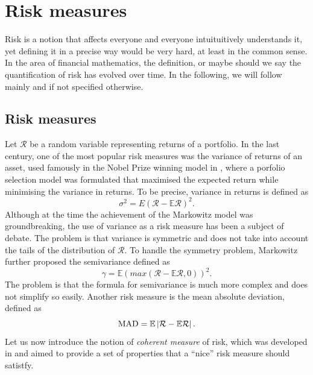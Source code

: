 \chapter{Risk measures}
Risk is a notion that affects everyone and everyone intuituitively understands it, yet defining it in a precise way would be very hard, at least in the common sense. In the area of financial mathematics, the definition, or maybe should we say the quantification of risk has evolved over time. In the following, we will follow mainly \cite{leoppold_risk_measures} and \cite[p. 275-278]{cornuejols_tutuncu_2006} if not specified otherwise.

\section{Risk measures	}
Let $\mathcal{R}$ be a random variable representing returns of a portfolio. In the last century, one of the most popular risk measures was the variance of returns of an asset, used famously in the Nobel Prize winning model in \cite{markowitz}, where a porfolio selection model was formulated that maximised the expected return while minimising the variance in returns. To be precise, variance in returns is defined as
\begin{equation*}
\sigma^2=E(\mathcal{R} - \mathbb{E}\mathcal{R} )^2.
\end{equation*}
Although at the time the achievement of the Markowitz model was groundbreaking, the use of variance as a risk measure has been a subject of debate. The problem is that variance is symmetric and does not take into account the tails of the distribution of $\mathcal{R}$. To handle the symmetry problem, Markowitz further proposed the semivariance defined as 
\begin{equation*}
\gamma=\mathbb{E}(max(\mathcal{R} - \mathbb{E}\mathcal{R},0))^2.
\end{equation*}
The problem is that the formula for semivariance is much more complex and does not simplify so easily. Another risk measure is the mean absolute deviation, defined as 
\begin{equation*}
\mathrm{MAD}=\mathbb{E}\left|{\mathcal{R} - \mathbb{E}\mathcal{R}}\right|.
\end{equation*}
Let us now introduce the notion of \textit{coherent measure} of risk, which was developed in \cite[Defintion 2.4.]{coherent_measures_of_risk} and aimed to provide a set of properties that a “nice” risk measure should satistfy.
